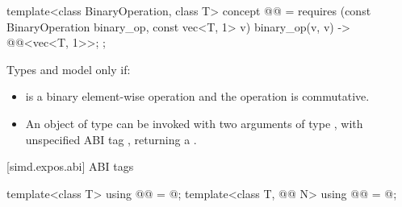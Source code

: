 \begin{itemdecl}
template<class BinaryOperation, class T>
  concept @@ =
    requires (const BinaryOperation binary_op, const vec<T, 1> v) {
      { binary_op(v, v) } -> @@<vec<T, 1>>;
    };
\end{itemdecl}

\begin{itemdescr}
\pnum
Types  and  model
 only if:
\begin{itemize}
\item {} is a binary element-wise operation and the
operation is commutative.

\item An object of type  can be invoked with two
arguments of type , with unspecified ABI tag
, returning a .
\end{itemize}
\end{itemdescr}

[simd.expos.abi]{ ABI tags}

\begin{itemdecl}
template<class T> using @@ = @\seebelow@;
template<class T, @@ N> using @@ = @\seebelow@;
\end{itemdecl}

